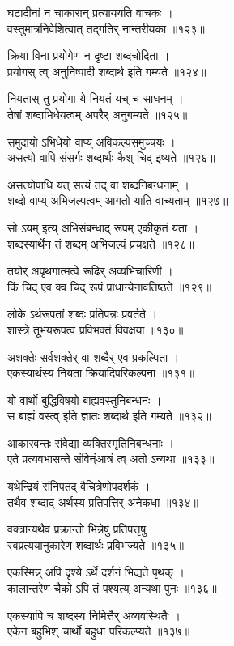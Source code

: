 घटादीनां न चाकारान् प्रत्याययति वाचकः ।\\वस्तुमात्रनिवेशित्वात् तद्गतिर् नान्तरीयका ॥१२३॥

क्रिया विना प्रयोगेण न दृष्टा शब्दचोदिता ।\\प्रयोगस् त्व् अनुनिष्पादी शब्दार्थ इति गम्यते ॥१२४॥

नियतास् तु प्रयोगा ये नियतं यच् च साधनम् ।\\तेषां शब्दाभिधेयत्वम् अपरैर् अनुगम्यते ॥१२५॥

समुदायो ऽभिधेयो वाप्य् अविकल्पसमुच्चयः ।\\असत्यो वापि संसर्गः शब्दार्थः कैश् चिद् इष्यते ॥१२६॥

असत्योपाधि यत् सत्यं तद् वा शब्दनिबन्धनाम् ।\\शब्दो वाप्य् अभिजल्पत्वम् आगतो याति वाच्यताम् ॥१२७॥

सो ऽयम् इत्य् अभिसंबन्धाद् रूपम् एकीकृतं यता ।\\शब्दस्यार्थेन तं शब्दम् अभिजल्पं प्रचक्षते ॥१२८॥

तयोर् अपृथगात्मत्वे रूढिर् अव्यभिचारिणी ।\\किं चिद् एव क्व चिद् रूपं प्राधान्येनावतिष्ठते ॥१२९॥

लोके ऽर्थरूपतां शब्दः प्रतिपन्नः प्रवर्तते ।\\शास्त्रे तूभयरूपत्वं प्रविभक्तं विवक्षया ॥१३०॥

अशक्तेः सर्वशक्तेर् वा शब्दैर् एव प्रकल्पिता ।\\एकस्यार्थस्य नियता क्रियादिपरिकल्पना ॥१३१॥

यो वार्थो बुद्धिविषयो बाह्यवस्तुनिबन्धनः ।\\स बाह्यं वस्त्व् इति ज्ञातः शब्दार्थ इति गम्यते ॥१३२॥

आकारवन्तः संवेद्या व्यक्तिस्मृतिनिबन्धनाः ।\\एते प्रत्यवभासन्ते संविन्ंआत्रं त्व् अतो ऽन्यथा ॥१३३॥

यथेन्द्रियं संनिपतद् वैचित्रेणोपदर्शकं ।\\तथैव शब्दाद् अर्थस्य प्रतिपत्तिर् अनेकधा ॥१३४॥

वक्त्रान्यथैव प्रक्रान्तो भिन्नेषु प्रतिपत्तृषु ।\\स्वप्रत्ययानुकारेण शब्दार्थः प्रविभज्यते ॥१३५॥

एकस्मिन्न् अपि दृश्ये ऽर्थे दर्शनं भिद्यते पृथक् ।\\कालान्तरेण चैको ऽपि तं पश्यत्य् अन्यथा पुनः ॥१३६॥

एकस्यापि च शब्दस्य निमित्तैर् अव्यवस्थितैः ।\\एकेन बहुभिश् चार्थो बहुधा परिकल्प्यते ॥१३७॥

